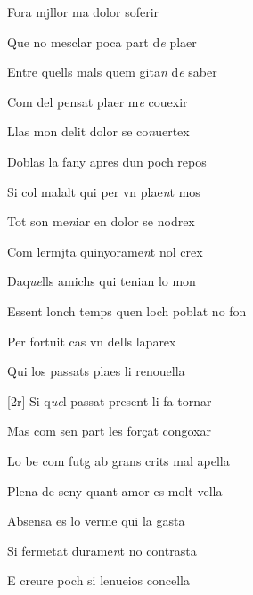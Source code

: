 \begin{estrofa}

 Fora mjllor ma dolor soferir

 Que no mesclar poca part d\textit{e} plaer

 Entre quells mals quem gita\textit{n} d\textit{e} saber

 Com del pensat  plaer m\textit{e} couexir

 Llas mon delit dolor se co\textit{n}uertex

 Doblas la fany apres dun poch repos

 Si col malalt qui per vn plae\textit{n}t mos

 Tot son me\textit{n}iar en dolor se nodrex

\end{estrofa}



\begin{estrofa}

 Com lermjta quinyorame\textit{n}t nol crex

 Daq\textit{ue}lls amichs qui tenian lo mon

 Essent lonch temps quen loch poblat no fon

 Per fortuit cas vn dells laparex

 Qui los passats plaes li renouella

 [2r] Si q\textit{ue}l passat present li fa tornar

 Mas com sen part les for\c{c}at congoxar

 Lo be com futg ab grans crits mal apella

\end{estrofa}



\begin{tornada}

 Plena de seny quant amor es molt vella

 Absensa es lo verme qui la gasta

 Si fermetat durame\textit{n}t no contrasta

 E creure poch si lenueios concella

\end{tornada}





